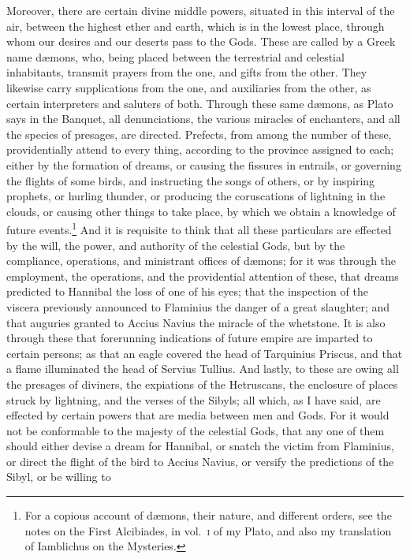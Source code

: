 \documentclass[12pt]{article}
\begin{document}
Moreover, there are certain divine middle powers, situated in this interval of
the air, between the highest ether and earth, which is in the lowest place,
through whom our desires and our deserts pass to the Gods.  These are called by
a Greek name d{\ae}mons, who, being placed between the terrestrial and
celestial inhabitants, transmit prayers from the one, and gifts from the other.
They likewise carry supplications from the one, and auxiliaries from the other,
as certain interpreters and saluters of both. Through these same d{\ae}mons, as
Plato says in the Banquet, all denunciations, the various miracles of
enchanters, and all the species of presages, are directed.  Prefects, from
among the number of these, providentially attend to every thing, according to
the province assigned to each; either by the formation of dreams, or causing
the fissures in entrails, or governing the flights of some birds, and
instructing the songs of others, or by inspiring prophets, or hurling thunder,
or producing the coruscations of lightning in the clouds, or causing other
things to take place, by which we obtain a knowledge of future
events.\footnote{For a copious account of d{\ae}mons, their nature, and
different orders, see the notes on the First Alcibiades, in vol.~\textsc{i} of
my Plato, and also my translation of Iamblichus on the
Mysteries.} And it is requisite to think that all these particulars are
effected by the will, the power, and authority of the celestial Gods, but by
the compliance, operations, and ministrant offices of d{\ae}mons; for it was
through the employment, the operations, and the providential attention of
these, that dreams predicted to Hannibal the loss of one of his eyes; that the
inspection of the viscera previously announced to Flaminius the danger of a
great slaughter; and that auguries granted to Accius Navius the miracle of the
whetstone. It is also through these that forerunning indications of future
empire are imparted to certain persons; as that an eagle covered the head of
Tarquinius Priscus, and that a flame illuminated the head of Servius Tullius.
And lastly, to these are owing all the presages of diviners, the expiations of
the Hetruscans, the enclosure of places struck by lightning, and the verses of
the Sibyls; all which, as I have said, are effected by certain powers that are
media between men and Gods.  For it would not be conformable to the majesty of
the celestial Gods, that any one of them should either devise a dream for
Hannibal, or snatch the victim from Flaminius, or direct the flight of the bird
to Accius Navius, or versify the predictions of the Sibyl, or be willing to
\end{document}
